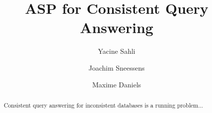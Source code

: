 \documentclass[acmsmall,review]{acmart}
\begin{document}
\title{ASP for Consistent Query Answering}


\author{Yacine Sahli}

\author{Joachim Sneessens}

\author{Maxime Daniels}

\renewcommand{\shortauthors}{Sahli, Sneesens and Daniels.}

\begin{abstract}
	Consistent query answering for inconsistent databases is a running problem...
\end{abstract}
\end{document}

